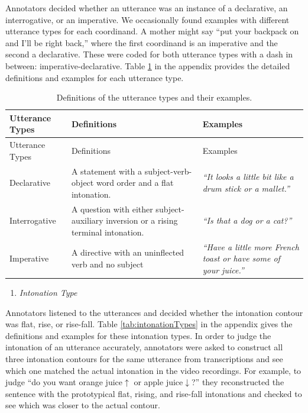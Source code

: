 \documentclass[
  english,
  ,man,floatsintext]{apa6}
\providecommand{\tightlist}{%
  \setlength{\itemsep}{0pt}\setlength{\parskip}{0pt}}
\begin{document}
Annotators decided whether an utterance was an instance of a declarative, an interrogative, or an imperative. We occasionally found examples with different utterance types for each coordinand. A mother might say ``put your backpack on and I'll be right back,'' where the first coordinand is an imperative and the second a declarative. These were coded for both utterance types with a dash in between: imperative-declarative. Table \ref{tab:utteranceTypes} in the appendix provides the detailed definitions and examples for each utterance type.

\begin{longtable}[]{@{}
  >{\raggedright\arraybackslash}p{}
  >{\raggedright\arraybackslash}p{}
  >{\raggedright\arraybackslash}p{}@{}}
\caption{\label{tab:utteranceTypes} Definitions of the utterance types and their examples.}\tabularnewline
\toprule
Utterance Types & Definitions & Examples \\
\midrule
\endfirsthead
\toprule
Utterance Types & Definitions & Examples \\
\midrule
\endhead
Declarative & A statement with a subject-verb-object word order and a flat intonation. & \emph{``It looks a little bit like a drum stick or a mallet.''} \\
Interrogative & A question with either subject-auxiliary inversion or a rising terminal intonation. & \emph{``Is that a dog or a cat?''} \\
Imperative & A directive with an uninflected verb and no subject & \emph{``Have a little more French toast or have some of your juice.''} \\
\bottomrule
\end{longtable}

\begin{enumerate}
\def\labelenumi{\arabic{enumi}.}
\setcounter{enumi}{3}
\tightlist
\item
  \emph{Intonation Type}
\end{enumerate}

Annotators listened to the utterances and decided whether the intonation contour was flat, rise, or rise-fall. Table \ref{tab:intonationTypes} in the appendix gives the definitions and examples for these intonation types. In order to judge the intonation of an utterance accurately, annotators were asked to construct all three intonation contours for the same utterance from transcriptions and see which one matched the actual intonation in the video recordings. For example, to judge ``do you want orange juice\(\uparrow\) or apple juice\(\downarrow\)?'' they reconstructed the sentence with the prototypical flat, rising, and rise-fall intonations and checked to see which was closer to the actual contour.
\end{document}
